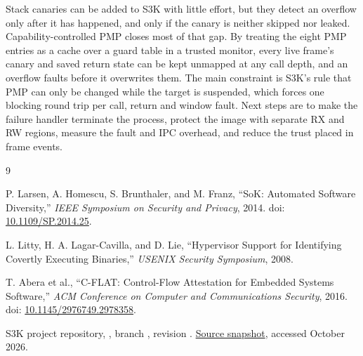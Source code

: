 \documentclass[10pt,a4paper]{article}
\newcommand{\code}[1]{\texttt{\detokenize{#1}}}
\begin{document}
Stack canaries can be added to S3K with little effort, but they detect an
overflow only after it has happened, and only if the canary is neither
skipped nor leaked. Capability-controlled PMP closes most of that gap. By
treating the eight PMP entries as a cache over a guard table in a trusted
monitor, every live frame's canary and saved return state can be kept
unmapped at any call depth, and an overflow faults before it overwrites
them. The main constraint is S3K's rule that PMP can only be changed while
the target is suspended, which forces one blocking round trip per call,
return and window fault. Next steps are to make the failure handler terminate
the process, protect the image with separate RX and RW regions, measure the
fault and IPC overhead, and reduce the trust placed in frame events.

\begin{thebibliography}{9}
\small

P. Larsen, A. Homescu, S. Brunthaler, and M. Franz,
``SoK: Automated Software Diversity,''
\emph{IEEE Symposium on Security and Privacy}, 2014.
doi: \href{https://doi.org/10.1109/SP.2014.25}{10.1109/SP.2014.25}.

L. Litty, H. A. Lagar-Cavilla, and D. Lie,
``Hypervisor Support for Identifying Covertly Executing Binaries,''
\emph{USENIX Security Symposium}, 2008.

T. Abera et al.,
``C-FLAT: Control-Flow Attestation for Embedded Systems Software,''
\emph{ACM Conference on Computer and Communications Security}, 2016.
doi: \href{https://doi.org/10.1145/2976749.2978358}{10.1145/2976749.2978358}.

S3K project repository, \code{agpira1/s3k}, branch \code{2024-sys-sec},
revision \code{ab70873}.
\href{https://github.com/agpira1/s3k/tree/ab70873}{Source snapshot},
accessed October 2026.

\end{thebibliography}
\end{document}
